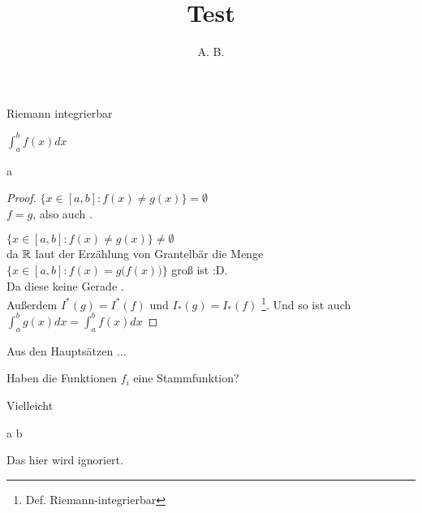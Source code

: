 \documentclass[]{article}
\title{Test}
\author{A. B.}
\begin{document}
\maketitle

\begin{task}
	\begin{task-todo}
		\item Riemann integrierbar
		\item $\int_{a}^{b} f(x) dx$
	\end{task-todo}
	
	\begin{subtask}{a}
		\begin{proof}
			$\{ x \in [a,b]: f(x) \neq g(x) \} = \emptyset $ \\
			\Implies $f = g$, also auch .
			
			$\{ x \in [a,b]: f(x) \neq g(x) \} \neq \emptyset $ \\
			da $\mathbin{\mathbb{R}}$ laut der Erzählung von Grantelbär die Menge 
			$\big\{ x \in [a,b]: f(x) = g\big(f(x)\big) \big\}$ groß ist :D.\\
			
			Da diese keine Gerade .\\
			
			Außerdem $I^*(g) = I^*(f)$ und $I_*(g) = I_*(f)$ \footnote{Def. Riemann-integrierbar}.
			Und so ist auch $\int_{a}^{b} g(x) dx = \int_{a}^{b} f(x) dx$
		\end{proof}
	\end{subtask}
\end{task}

\begin{task}
	\begin{remark}
		Aus den Hauptsätzen $\dots$
	\end{remark}

	\begin{task-todo}
		\item Haben die Funktionen $f_i$ eine Stammfunktion?
	\end{task-todo}

	Vielleicht
	\begin{Eq*}
		a \limplies b
	\end{Eq*}

	\begin{ignore}
		Das hier wird ignoriert.
	\end{ignore}
\end{task}
\end{document}
